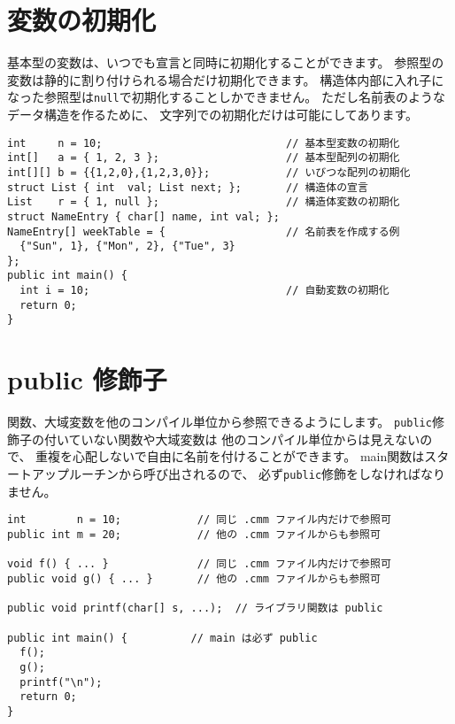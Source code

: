 \section{変数の初期化}

基本型の変数は、いつでも宣言と同時に初期化することができます。
参照型の変数は静的に割り付けられる場合だけ初期化できます。
構造体内部に入れ子になった参照型は\verb/null/で初期化することしかできません。
ただし名前表のようなデータ構造を作るために、
文字列での初期化だけは可能にしてあります。

\begin{mylist}
\begin{verbatim}
int     n = 10;                             // 基本型変数の初期化
int[]   a = { 1, 2, 3 };                    // 基本型配列の初期化
int[][] b = {{1,2,0},{1,2,3,0}};            // いびつな配列の初期化
struct List { int  val; List next; };       // 構造体の宣言
List    r = { 1, null };                    // 構造体変数の初期化
struct NameEntry { char[] name, int val; };
NameEntry[] weekTable = {                   // 名前表を作成する例
  {"Sun", 1}, {"Mon", 2}, {"Tue", 3}
};
public int main() {
  int i = 10;                               // 自動変数の初期化
  return 0;
}
\end{verbatim}
\end{mylist}

\section{public 修飾子}

関数、大域変数を他のコンパイル単位から参照できるようにします。
\verb/public/修飾子の付いていない関数や大域変数は
他のコンパイル単位からは見えないので、
重複を心配しないで自由に名前を付けることができます。
main関数はスタートアップルーチンから呼び出されるので、
必ず\verb/public/修飾をしなければなりません。

\begin{mylist}
\begin{verbatim}
int        n = 10;            // 同じ .cmm ファイル内だけで参照可
public int m = 20;            // 他の .cmm ファイルからも参照可

void f() { ... }              // 同じ .cmm ファイル内だけで参照可
public void g() { ... }       // 他の .cmm ファイルからも参照可

public void printf(char[] s, ...);  // ライブラリ関数は public

public int main() {          // main は必ず public
  f();
  g();
  printf("\n");
  return 0;
}
\end{verbatim}
\end{mylist}

